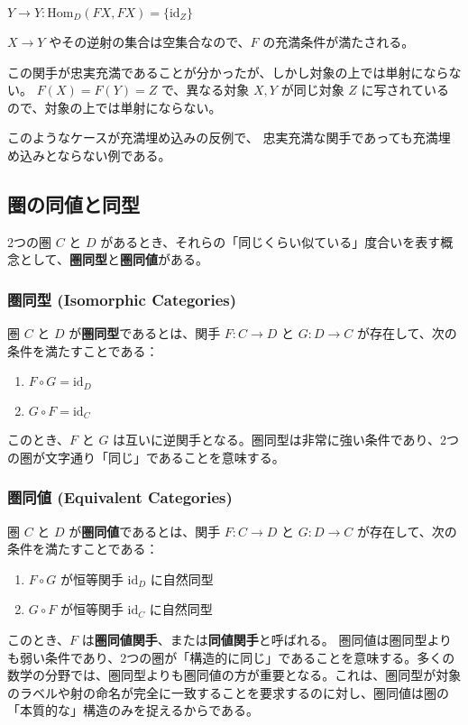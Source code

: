 \documentclass[uplatex,a4j,12pt,dvipdfmx]{jsarticle}
\begin{document}
$Y \to Y: \text{Hom}_{D}(FX,FX) = \{ \text{id}_{Z} \}$

$X \to Y$ やその逆射の集合は空集合なので、$F$ の充満条件が満たされる。

この関手が忠実充満であることが分かったが、しかし対象の上では単射にならない。
$F(X)=F(Y)=Z$ で、異なる対象 $X,Y$ が同じ対象 $Z$ に写されているので、対象の上では単射にならない。

このようなケースが充満埋め込みの反例で、
忠実充満な関手であっても充満埋め込みとならない例である。


\subsection{圏の同値と同型}
2つの圏 $C$ と $D$ があるとき、それらの「同じくらい似ている」度合いを表す概念として、\textbf{圏同型}と\textbf{圏同値}がある。

\subsubsection{圏同型 (Isomorphic Categories)}
圏 $C$ と $D$ が\textbf{圏同型}であるとは、関手 $F: C \to D$ と $G: D \to C$ が存在して、次の条件を満たすことである：
\begin{enumerate}
	\item $F \circ G = \mathrm{id}_D$
	\item $G \circ F = \mathrm{id}_C$
\end{enumerate}
このとき、$F$ と $G$ は互いに逆関手となる。圏同型は非常に強い条件であり、2つの圏が文字通り「同じ」であることを意味する。

\subsubsection{圏同値 (Equivalent Categories)}
圏 $C$ と $D$ が\textbf{圏同値}であるとは、関手 $F: C \to D$ と $G: D \to C$ が存在して、次の条件を満たすことである：
\begin{enumerate}
	\item $F \circ G$ が恒等関手 $\mathrm{id}_D$ に自然同型
	\item $G \circ F$ が恒等関手 $\mathrm{id}_C$ に自然同型
\end{enumerate}
このとき、$F$ は\textbf{圏同値関手}、または\textbf{同値関手}と呼ばれる。
圏同値は圏同型よりも弱い条件であり、2つの圏が「構造的に同じ」であることを意味する。多くの数学の分野では、圏同型よりも圏同値の方が重要となる。これは、圏同型が対象のラベルや射の命名が完全に一致することを要求するのに対し、圏同値は圏の「本質的な」構造のみを捉えるからである。
\end{document}
